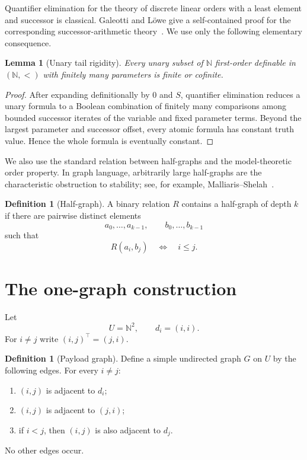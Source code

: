 \documentclass[11pt]{article}
\newtheorem{lemma}[theorem]{Lemma}
\theoremstyle{definition}
\newtheorem{definition}[theorem]{Definition}
\newcommand{\N}{\mathbb N}
\begin{document}
Quantifier elimination for the theory of discrete linear orders with a least element and successor is classical.  Galeotti and L\"owe give a self-contained proof for the corresponding successor-arithmetic theory~\cite{GaleottiLoewe2022}.  We use only the following elementary consequence.

\begin{lemma}[Unary tail rigidity]\label{lem:unary}
Every unary subset of $\N$ first-order definable in $(\N,<)$ with finitely many parameters is finite or cofinite.
\end{lemma}

\begin{proof}
After expanding definitionally by $0$ and $S$, quantifier elimination reduces a unary formula to a Boolean combination of finitely many comparisons among bounded successor iterates of the variable and fixed parameter terms.  Beyond the largest parameter and successor offset, every atomic formula has constant truth value.  Hence the whole formula is eventually constant.
\end{proof}

We also use the standard relation between half-graphs and the model-theoretic order property.  In graph language, arbitrarily large half-graphs are the characteristic obstruction to stability; see, for example, Malliaris--Shelah~\cite{MalliarisShelah2014}.

\begin{definition}[Half-graph]
A binary relation $R$ contains a half-graph of depth $k$ if there are pairwise distinct elements
\[
a_0,\dots,a_{k-1},\qquad b_0,\dots,b_{k-1}
\]
such that
\[
R(a_i,b_j)\quad\Longleftrightarrow\quad i\le j.
\]
\end{definition}

\section{The one-graph construction}

Let
\[
U=\N^2,
\qquad d_i=(i,i).
\]
For $i\ne j$ write $(i,j)^\top=(j,i)$.

\begin{definition}[Payload graph]\label{def:graph}
Define a simple undirected graph $G$ on $U$ by the following edges.
For every $i\ne j$:
\begin{enumerate}[label=(\roman*)]
\item $(i,j)$ is adjacent to $d_i$;
\item $(i,j)$ is adjacent to $(j,i)$;
\item if $i<j$, then $(i,j)$ is also adjacent to $d_j$.
\end{enumerate}
No other edges occur.
\end{definition}
\end{document}
